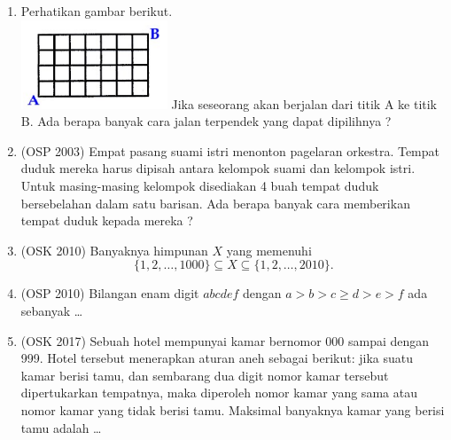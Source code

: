 \begin{enumerate}
    \item Perhatikan gambar berikut.\\
    \includegraphics[scale=1.2]{kombin.PNG}
    Jika seseorang akan berjalan dari titik A ke titik B. Ada berapa banyak cara jalan terpendek 
yang dapat dipilihnya ?
    
    \item (OSP 2003) Empat pasang suami istri menonton pagelaran orkestra. Tempat duduk mereka harus 
dipisah antara kelompok suami dan kelompok istri. Untuk masing-masing kelompok disediakan 4
buah tempat duduk bersebelahan dalam satu barisan. Ada berapa banyak cara memberikan 
tempat duduk kepada mereka ?

    \item (OSK 2010) Banyaknya himpunan $X$ yang memenuhi 
$$\{1,2,\dots,1000\} \subseteq X \subseteq \{1,2,\dots,2010\}.$$

    \item (OSP 2010) Bilangan enam digit $abcdef$ dengan $a > b > c \ge d > e > f$ ada sebanyak \dots
    
    \item (OSK 2017)
	Sebuah hotel mempunyai kamar bernomor 000 sampai dengan 999. Hotel tersebut menerapkan
aturan aneh sebagai berikut: jika suatu kamar berisi tamu, dan sembarang dua digit nomor kamar
tersebut dipertukarkan tempatnya, maka diperoleh nomor kamar yang sama atau nomor kamar
yang tidak berisi tamu. Maksimal banyaknya kamar yang berisi tamu adalah \dots
\end{enumerate}

